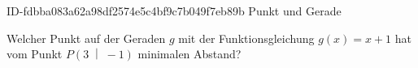 \begin{exercise}
      {ID-fdbba083a62a98df2574e5c4bf9c7b049f7eb89b}
      {Punkt und Gerade}
  \ifproblem\problem\par
    Welcher Punkt auf der Geraden $g$ mit der
    Funktionsgleichung $g(x)=x+1$ hat vom Punkt
    $P\left(3\;\middle|\;-1\right)$ minimalen
    Abstand?
  \fi
\end{exercise}

